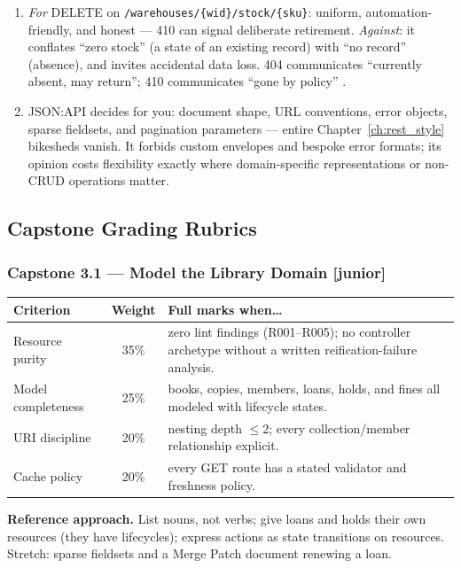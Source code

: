 \begin{enumerate}[label=\textbf{(7.\arabic*)}, leftmargin=3.2em]
    understands the uniform semantics without new code
    \cite{fielding2000rest}.
  \item \emph{For} DELETE on \texttt{/warehouses/\{wid\}/stock/\{sku\}}:
    uniform, automation-friendly, and honest --- 410 can signal deliberate
    retirement. \emph{Against}: it conflates ``zero stock'' (a state of an
    existing record) with ``no record'' (absence), and invites accidental
    data loss. 404 communicates ``currently absent, may return''; 410
    communicates ``gone by policy'' \cite{rfc9110}.
  \item JSON:API decides for you: document shape, URL conventions, error
    objects, sparse fieldsets, and pagination parameters --- entire
    Chapter~\ref{ch:rest_style} bikesheds vanish. It forbids custom
    envelopes and bespoke error formats; its opinion costs flexibility
    exactly where domain-specific representations or non-CRUD operations
    matter.
\end{enumerate}

\subsection{Capstone Grading Rubrics}

\subsubsection*{Capstone 3.1 --- Model the Library Domain [junior]}
\begin{center}\small
\begin{tabularx}{\textwidth}{l c X}
\toprule
\textbf{Criterion} & \textbf{Weight} & \textbf{Full marks when\ldots} \\
\midrule
Resource purity & 35\% & zero lint findings (R001--R005); no controller archetype without a written reification-failure analysis. \\
Model completeness & 25\% & books, copies, members, loans, holds, and fines all modeled with lifecycle states. \\
URI discipline & 20\% & nesting depth $\leq$2; every collection/member relationship explicit. \\
Cache policy & 20\% & every GET route has a stated validator and freshness policy. \\
\bottomrule
\end{tabularx}
\end{center}
\textbf{Reference approach.} List nouns, not verbs; give loans and holds
their own resources (they have lifecycles); express actions as state
transitions on resources. Stretch: sparse fieldsets and a Merge Patch
document renewing a loan.

